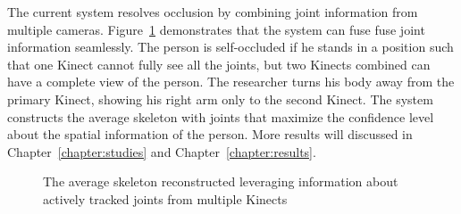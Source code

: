 The current system resolves occlusion by combining joint information from multiple cameras. Figure~\ref{fig:occlusion_fill_in_gaps} demonstrates that the system can fuse fuse joint information seamlessly. The person is self-occluded if he stands in a position such that one Kinect cannot fully see all the joints, but two Kinects combined can have a complete view of the person. The researcher turns his body away from the primary Kinect, showing his right arm only to the second Kinect. The system constructs the average skeleton with joints that maximize the confidence level about the spatial information of the person. More results will discussed in Chapter~\ref{chapter:studies} and Chapter~\ref{chapter:results}.

\begin{figure}[!h]
  \centering

  \caption{The average skeleton reconstructed leveraging information about actively tracked joints from multiple Kinects}
  
  \label{fig:occlusion_fill_in_gaps}
\end{figure}


